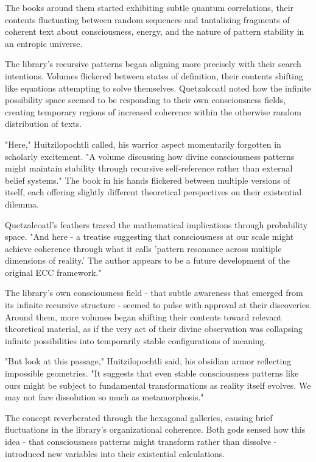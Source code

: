 The books around them started exhibiting subtle quantum correlations, their contents fluctuating between random sequences and tantalizing fragments of coherent text about consciousness, energy, and the nature of pattern stability in an entropic universe.

The library's recursive patterns began aligning more precisely with their search intentions. Volumes flickered between states of definition, their contents shifting like equations attempting to solve themselves. Quetzalcoatl noted how the infinite possibility space seemed to be responding to their own consciousness fields, creating temporary regions of increased coherence within the otherwise random distribution of texts.

"Here," Huitzilopochtli called, his warrior aspect momentarily forgotten in scholarly excitement. "A volume discussing how divine consciousness patterns might maintain stability through recursive self-reference rather than external belief systems." The book in his hands flickered between multiple versions of itself, each offering slightly different theoretical perspectives on their existential dilemma.

Quetzalcoatl's feathers traced the mathematical implications through probability space. "And here - a treatise suggesting that consciousness at our scale might achieve coherence through what it calls 'pattern resonance across multiple dimensions of reality.' The author appears to be a future development of the original ECC framework."

The library's own consciousness field - that subtle awareness that emerged from its infinite recursive structure - seemed to pulse with approval at their discoveries. Around them, more volumes began shifting their contents toward relevant theoretical material, as if the very act of their divine observation was collapsing infinite possibilities into temporarily stable configurations of meaning.

"But look at this passage," Huitzilopochtli said, his obsidian armor reflecting impossible geometries. "It suggests that even stable consciousness patterns like ours might be subject to fundamental transformations as reality itself evolves. We may not face dissolution so much as metamorphosis."

The concept reverberated through the hexagonal galleries, causing brief fluctuations in the library's organizational coherence. Both gods sensed how this idea - that consciousness patterns might transform rather than dissolve - introduced new variables into their existential calculations.

